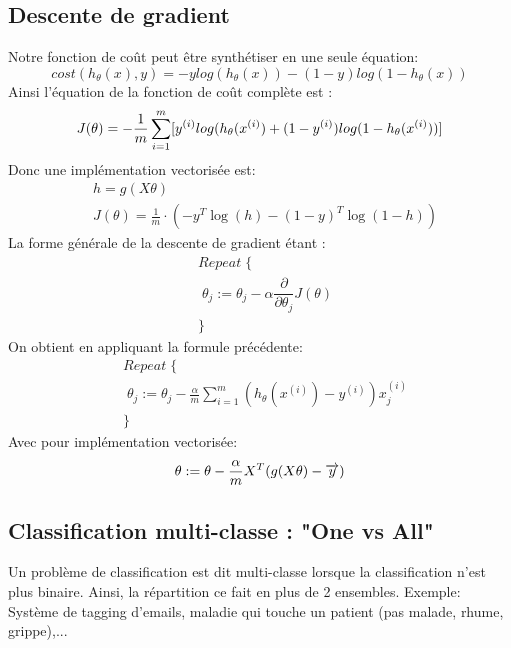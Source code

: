 \documentclass{article}
\theoremstyle{definition}
\begin{document}
\subsection{Descente de gradient}
Notre fonction de coût peut être synthétiser en une seule équation:
\begin{equation*}
cost(h_\theta(x),y) = -y log(h_\theta(x)) - (1-y) log(1-h_\theta(x))
\end{equation*}
Ainsi l'équation de la fonction de coût complète est :
\begin{equation*}
J(\theta) = -{1\over m} \sum_{i=1}^{m}
[y^{(i)}log(h_\theta(x^{(i)})+(1-y^{(i)})log(1-h_\theta(x^{(i)}))]
\end{equation*}
Donc une implémentation vectorisée est:
\begin{align*} & h = g(X\theta)\\ & J(\theta) = \frac{1}{m} \cdot \left(-y^{T}\log(h)-(1-y)^{T}\log(1-h)\right) 
\end{align*}
La forme générale de la descente de gradient étant : 
\begin{align*}& Repeat \; \lbrace \\ & \; \theta_j := \theta_j - \alpha \dfrac{\partial}{\partial \theta_j}J(\theta) \\ & \rbrace
\end{align*}
On obtient en appliquant la formule précédente:
\begin{align*} & Repeat \; \lbrace \\ & \; \theta_j := \theta_j - \frac{\alpha}{m} \sum_{i=1}^m (h_\theta(x^{(i)}) - y^{(i)}) x_j^{(i)} \\ & \rbrace 
\end{align*}
Avec pour implémentation vectorisée:
\begin{equation*}
\theta := \theta - {\alpha \over m}X^T(g(X\theta) - \overrightarrow{y})
\end{equation*}
\subsection{Classification multi-classe : "One vs All"}
Un problème de classification est dit multi-classe lorsque la classification n'est plus binaire. Ainsi, la répartition ce fait en plus de 2 ensembles. \newline
Exemple: Système de tagging d'emails, maladie qui touche un patient (pas malade, rhume, grippe),... 
\end{document}
